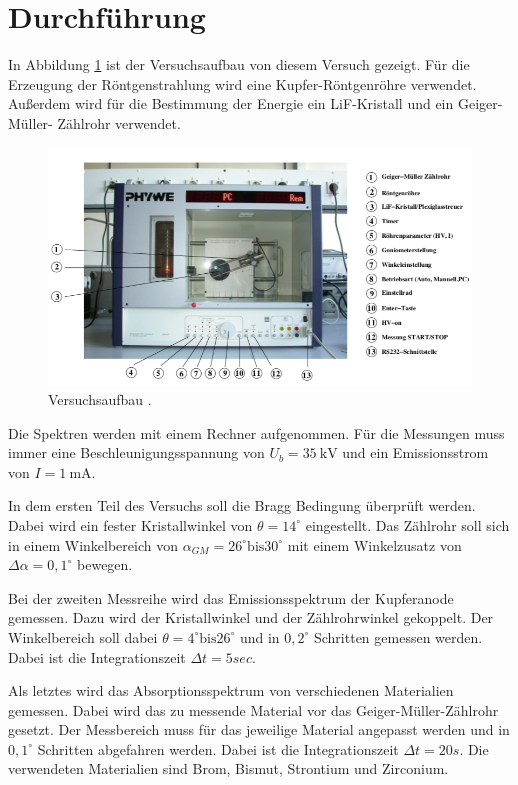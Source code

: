\section{Durchführung}

In Abbildung \ref{abb:2} ist der Versuchsaufbau von diesem Versuch gezeigt.
Für die Erzeugung der Röntgenstrahlung wird eine Kupfer-Röntgenröhre verwendet.
Außerdem wird für die Bestimmung der Energie ein LiF-Kristall und ein Geiger-Müller-
Zählrohr verwendet.

\begin{figure}[H]
  \centering
  \includegraphics[width=\textwidth]{content/Versuchsaufbau.png}
  \caption{Versuchsaufbau \cite{1}.}
  \label{abb:2}
\end{figure}

Die Spektren werden mit einem Rechner aufgenommen. Für die Messungen muss immer eine
Beschleunigungsspannung von $U_b = \SI{35}{\kilo\volt}$ und ein Emissionsstrom von
$I = \SI{1}{\milli\ampere}$.

In dem ersten Teil des Versuchs soll die Bragg Bedingung überprüft werden. Dabei wird
ein fester Kristallwinkel von $\theta = 14^\circ$ eingestellt. Das Zählrohr soll sich
in einem Winkelbereich von $\alpha_{GM} = 26^\circ \text{bis} 30^\circ$ mit einem
Winkelzusatz von $\Delta \alpha = 0,1^\circ$ bewegen.

Bei der zweiten Messreihe wird das Emissionsspektrum der Kupferanode gemessen.
Dazu wird der Kristallwinkel und der Zählrohrwinkel gekoppelt. Der Winkelbereich
soll dabei $\theta = 4^\circ \text{bis} 26^\circ$ und in $0,2^\circ$ Schritten
gemessen werden. Dabei ist die Integrationszeit $\Delta t = 5 sec$.

Als letztes wird das Absorptionsspektrum von verschiedenen Materialien gemessen.
Dabei wird das zu messende Material vor das Geiger-Müller-Zählrohr gesetzt. Der Messbereich
muss für das jeweilige Material angepasst werden und in $0,1^\circ$ Schritten abgefahren werden.
Dabei ist die Integrationszeit $\Delta t = 20s$.
Die verwendeten Materialien sind Brom, Bismut, Strontium und Zirconium.
